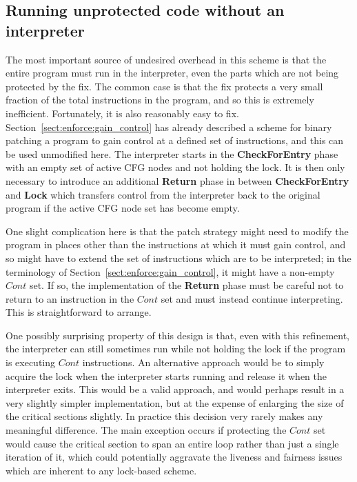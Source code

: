 \subsection{Running unprotected code without an interpreter}

The most important source of undesired overhead in this scheme is that
the entire program must run in the interpreter, even the parts which
are not being protected by the fix.  The common case is that the fix
protects a very small fraction of the total instructions in the
program, and so this is extremely inefficient.  Fortunately, it is
also reasonably easy to fix.  Section~\ref{sect:enforce:gain_control}
has already described a scheme for binary patching a program to gain
control at a defined set of instructions, and this can be used
unmodified here.  The interpreter starts in the \textbf{CheckForEntry}
phase with an empty set of active CFG nodes and not holding the lock.
It is then only necessary to introduce an additional \textbf{Return}
phase in between \textbf{CheckForEntry} and \textbf{Lock} which
transfers control from the interpreter back to the original program if
the active CFG node set has become empty.

One slight complication here is that the patch strategy might need to
modify the program in places other than the instructions at which it
must gain control, and so might have to extend the set of instructions
which are to be interpreted; in the terminology of
Section~\ref{sect:enforce:gain_control}, it might have a non-empty
$\mathit{Cont}$ set.  If so, the implementation of the \textbf{Return}
phase must be careful not to return to an instruction in the
$\mathit{Cont}$ set and must instead continue interpreting.  This is
straightforward to arrange.

One possibly surprising property of this design is that, even with
this refinement, the interpreter can still sometimes run while not
holding the lock if the program is executing $\mathit{Cont}$
instructions.  An alternative approach would be to simply acquire the
lock when the interpreter starts running and release it when the
interpreter exits.  This would be a valid approach, and would perhaps
result in a very slightly simpler implementation, but at the expense
of enlarging the size of the critical sections slightly.  In practice
this decision very rarely makes any meaningful difference.  The main
exception occurs if protecting the $\mathit{Cont}$ set would cause the
critical section to span an entire loop rather than just a single
iteration of it, which could potentially aggravate the liveness and
fairness issues which are inherent to any lock-based scheme.

